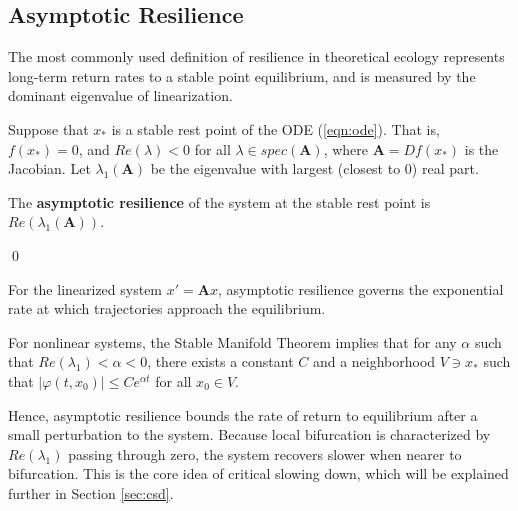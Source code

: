 \subsection{Asymptotic Resilience}

The most commonly used definition of resilience in theoretical ecology represents long-term return rates to a stable point equilibrium, and is measured by the dominant eigenvalue of linearization. 

\begin{definition}
	\label{def:asymp}
	Suppose that $x_\ast$ is a stable rest point of the ODE (\ref{eqn:ode}). That is, $f(x_\ast) = 0$, and $Re(\lambda) < 0$ for all $\lambda \in spec(\textbf{A})$, where $\textbf{A} = Df(x_\ast)$ is the Jacobian. Let $\lambda_1(\textbf{A})$ be the eigenvalue with largest (closest to 0) real part. 
	
	\begin{center}
	The \textbf{asymptotic resilience} of the system at the stable rest point is $Re(\lambda_1(\textbf{A}))$.
	\end{center}

	 \qed 
\end{definition}

For the linearized system $x'= \textbf{A}x$, asymptotic resilience governs the exponential rate at which trajectories approach the equilibrium. 

For nonlinear systems, the Stable Manifold Theorem implies 
that for any $\alpha$ such that $Re(\lambda_1) < \alpha < 0$, there exists a constant $C$ and a neighborhood $V \ni x_\ast$ such that  $|\varphi(t,x_0)| \leq Ce^{\alpha t}$ for all $x_0 \in V$.

Hence, asymptotic resilience bounds the rate of return to equilibrium after a small perturbation to the system. Because local bifurcation is characterized by $Re(\lambda_1)$ passing through zero, the system recovers slower when nearer to bifurcation. This is the core idea of critical slowing down, which will be explained further in Section \ref{sec:csd}.